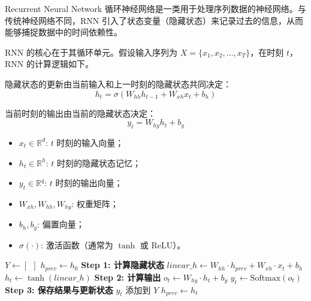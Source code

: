 \documentclass{article}
\begin{document}
Recurrent Neural Network 循环神经网络是一类用于处理序列数据的神经网络。与传统神经网络不同，RNN 引入了状态变量（隐藏状态）来记录过去的信息，从而能够捕捉数据中的时间依赖性。

RNN 的核心在于其循环单元。假设输入序列为 $X = \{x_1, x_2, \dots, x_T\}$，在时刻 $t$，RNN 的计算逻辑如下。

隐藏状态的更新由当前输入和上一时刻的隐藏状态共同决定：
\[ h_t = \sigma(W_{hh} h_{t-1} + W_{xh} x_t + b_h) \]

当前时刻的输出由当前的隐藏状态决定：
\[ y_t = W_{hy} h_t + b_y \]

\begin{itemize}
    \item $x_t \in \mathbb{R}^d$: $t$ 时刻的输入向量；
    \item $h_t \in \mathbb{R}^h$: $t$ 时刻的隐藏状态记忆；
    \item $y_t \in \mathbb{R}^q$: $t$ 时刻的输出向量；
    \item $W_{xh}, W_{hh}, W_{hy}$: 权重矩阵；
    \item $b_h, b_y$: 偏置向量；
    \item $\sigma(\cdot)$: 激活函数（通常为 $\tanh$ 或 $\text{ReLU}$）。
\end{itemize}

\begin{algorithm}[H]
    \caption{RNN 前向传播算法}
    \begin{algorithmic}[1]
        \State{} $Y \gets [\ \ ]$
        \State\@$h_{prev} \gets h_0$ 
            \State\textbf{Step 1: 计算隐藏状态}
            \State\@$linear\_h \gets W_{hh} \cdot h_{prev} + W_{xh} \cdot x_t + b_h$
            \State\@$h_t \gets \tanh(linear\_h)$ 
            \State\textbf{Step 2: 计算输出}
            \State\@$o_t \gets W_{hy} \cdot h_t + b_y$
            \State\@$y_t \gets \text{Softmax}(o_t)$ 
            \State\textbf{Step 3: 保存结果与更新状态}
            \State{} $y_t$ 添加到 $Y$
            \State\@$h_{prev} \gets h_t$
        \EndFor{}
        \State{}
    \end{algorithmic}
\end{algorithm}
\end{document}
